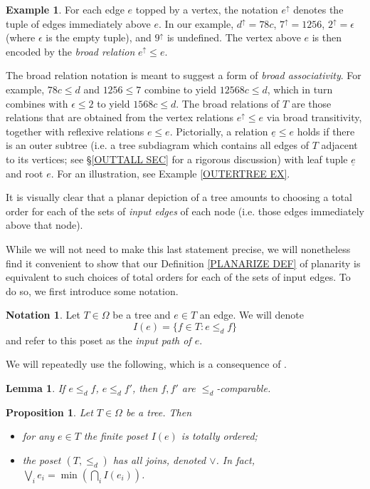 \documentclass[a4paper,10pt
,draft
]{article}%
\numberwithin{equation}{section}
\numberwithin{figure}{section}
\newtheorem{lemma}[equation]{Lemma}%
\newtheorem{proposition}[equation]{Proposition}%
\theoremstyle{definition} %
\newtheorem{example}[equation]{Example}%
\newtheorem{notation}[equation]{Notation}%
\newcommand{\1}{\ensuremath{\mathbbm 1}}%
\begin{document}
\begin{example}
For each edge $e$ topped by a vertex, the notation $e^{\uparrow}$ denotes the tuple of edges immediately above $e$.
In our example, 
$d^{\uparrow} = 78c$,
$7^{\uparrow} = 1256$,
$2^{\uparrow} = \epsilon$ 
(where $\epsilon$ is the empty tuple),
and $9^{\uparrow}$ is undefined.
The vertex above $e$ is then encoded by the \emph{broad relation}
$e^{\uparrow} \leq e$.

The broad relation notation is meant to suggest a form of 
\emph{broad associativity}. For example,
$78c \leq d$ and $1256 \leq 7$ combine to yield
$12568c \leq d$,
which
in turn combines with $\epsilon \leq 2$
to yield $1568c \leq d$.
The broad relations of $T$ are those relations that are obtained from the vertex relations $e^{\uparrow} \leq e$
via broad transitivity, together with reflexive relations
$e \leq e$.
Pictorially, a relation 
$\underline{e} \leq e$ holds 
if there is an outer subtree
(i.e. a tree subdiagram 
which contains all edges of $T$ adjacent to its vertices;
see \S \ref{OUTTALL SEC} for a rigorous discussion)
with leaf tuple 
$\underline{e}$ and root $e$.
For an illustration, see Example \ref{OUTERTREE EX}.
\end{example}


It is visually clear that a planar depiction of a tree amounts to choosing a total order for each of the sets of \textit{input edges} of each node (i.e. those edges immediately above that node).

While we will not need to make this last statement precise, we will nonetheless find it convenient to show that our Definition \ref{PLANARIZE DEF} of planarity is equivalent to such choices of total orders for each of the sets of input edges.
To do so, we first introduce some notation.


\begin{notation}\label{INPUTPATH NOT}
	Let $T \in \Omega$ be a tree and $e \in T$ an edge. We will denote
	\[ I(e) =\{f \in T \colon e \leq_d f \} \]
and refer to this poset as the \textit{input path of $e$}.
\end{notation}

We will repeatedly use the following, which is a consequence of \cite[Cor. 5.26]{Pe17}.

\begin{lemma}\label{INCOMPNOTOP}
If $e \leq_d f$, $e \leq_d f'$, then $f,f'$ are $\leq_d$-comparable. 
\end{lemma}


\begin{proposition}\label{INPUTPATHS PROP}
	Let $T \in \Omega$ be a tree. Then
	\begin{itemize}
		\item[(a)] for any $e \in T$ the finite poset $I(e)$ is totally ordered;
		\item[(b)] the poset $(T,\leq_d)$ has all joins, denoted $\vee$. In fact, $\bigvee_{i} e_i = \min (\bigcap_{i} I(e_i))$.
	\end{itemize}
\end{proposition}
\end{document}
